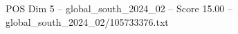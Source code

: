 \begin{textsample}{POS Dim 5 – global\_south\_2024\_02 – Score 15.00 – global\_south\_2024\_02/105733376.txt}
\end{textsample}
